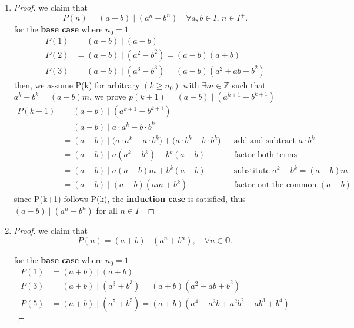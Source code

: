 \begin{enumerate}[label=\arabic*.]
        \item 
        \begin{proof}
        we claim that
        \[
            P(n) = (a-b) \mid (a^n - b^n) \quad \forall a,b \in I,\, n
  \in I^+.
        \]
        for the \textbf{base case} where $n_0 = 1$
        \[
        \begin{aligned}
        P(1) &= (a-b) \mid (a - b)\\
        P(2) &= (a-b) \mid (a^2 - b^2) = (a-b)(a+b) \\
        P(3) &= (a-b) \mid (a^3 - b^3) = (a-b)(a^2 + ab + b^2)
        \end{aligned}
        \]
        then, we assume P(k) for arbitrary $(k \ge n_0)$ with $\exists
  m \in \mathbb{Z}$ such that $a^k - b^k = (a-b)m$, we prove $p(k+1) =
  (a-b) \mid (a^{k+1} - b^{k+1})$
        \begin{align*}
        P(k+1) &= (a-b) \mid (a^{k+1} - b^{k+1})\\
        &= (a-b) \mid a \cdot a^k - b \cdot b^k\\
        &= (a-b) \mid \bigl(a \cdot a^k - a \cdot b^k\bigr) + \bigl(a
  \cdot b^k - b \cdot b^k\bigr) && \text{add and subtract }a \cdot
  b^k\\
        &= (a-b) \mid a(a^k - b^k) + b^k(a - b) && \text{factor both
  terms}\\
        &= (a-b) \mid a(a-b)m + b^k(a - b) && \text{substitute }a^k -
  b^k = (a-b)m\\
        &= (a-b) \mid (a-b)(am + b^k) && \text{factor out the common }
  (a-b)
        \end{align*}
        since P(k+1) follows P(k), the \textbf{induction case} is
  satisfied, thus $(a-b) \mid (a^n - b^n)$ for all $n \in I^+$
        \end{proof}

        \item 
        \begin{proof}

    we claim that
    \[
    P(n) = (a+b) \mid (a^n + b^n), \quad \forall n \in \mathbb{O}.
    \]

    for the \textbf{base case} where $n_0 = 1$
    \[
    \begin{aligned}
    P(1) &= (a+b) \mid (a + b) \\
    P(3) &= (a+b) \mid (a^3 + b^3) = (a+b)(a^2 - ab + b^2)\\
    P(5) &= (a+b) \mid (a^5 + b^5) = (a+b)(a^4 - a^3b + a^2b^2 - ab^3 + b^4) 
    \end{aligned}
    \]


\end{proof}
\end{enumerate}
